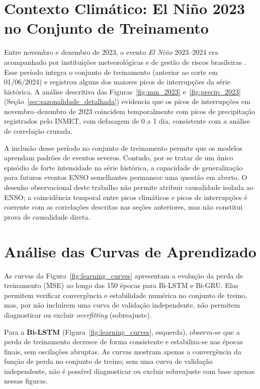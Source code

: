 \section{Contexto Climático: El Niño 2023 no Conjunto de Treinamento}\label{sec:anomalia}
Entre novembro e dezembro de 2023, o evento \textit{El Niño} 2023--2024 era acompanhado por instituições meteorológicas e de gestão de riscos brasileiras \cite{inpe2023painel}. Esse período integra o conjunto de treinamento (anterior ao corte em 01/06/2024) e registrou alguns dos maiores picos de interrupções da série histórica. A análise descritiva das Figuras~\ref{fig:mm_2023} e~\ref{fig:precip_2023} (Seção~\ref{sec:sazonalidade_detalhada}) evidencia que os picos de interrupções em novembro--dezembro de 2023 coincidem temporalmente com picos de precipitação registrados pelo INMET, com defasagem de 0 a 1 dia, consistente com a análise de correlação cruzada.

A inclusão desse período no conjunto de treinamento permite que os modelos aprendam padrões de eventos severos. Contudo, por se tratar de um único episódio de forte intensidade na série histórica, a capacidade de generalização para futuros eventos ENSO semelhantes permanece uma questão em aberto. O desenho observacional deste trabalho não permite atribuir causalidade isolada ao ENSO; a coincidência temporal entre picos climáticos e picos de interrupções é coerente com as correlações descritas nas seções anteriores, mas não constitui prova de causalidade direta.

\section{Análise das Curvas de Aprendizado}\label{sec:learning_curves}

As curvas da Figura~\ref{fig:learning_curves} apresentam a evolução da perda de treinamento (MSE) ao longo das 150 épocas para Bi-LSTM e Bi-GRU. Elas permitem verificar convergência e estabilidade numérica no conjunto de treino, mas, por não incluírem uma curva de validação independente, não permitem diagnosticar ou excluir \textit{overfitting} (sobreajuste).

Para a \textbf{Bi-LSTM} (Figura~\ref{fig:learning_curves}, esquerda), observa-se que a perda de treinamento decresce de forma consistente e estabiliza-se nas épocas finais, sem oscilações abruptas. As curvas mostram apenas a convergência da função de perda no conjunto de treino; sem uma curva de validação independente, não é possível diagnosticar ou excluir sobreajuste com base apenas nessas figuras.

